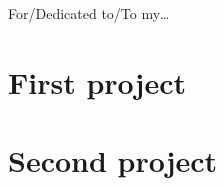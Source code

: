 \documentclass[10pt, twoside]{Thesis}
\begin{document}
\begin{glossary}
\end{glossary}



\begin{dedicatory}
	For/Dedicated to/To my\ldots
\end{dedicatory}



\addvspacetoc{3mm} %

\mainmatter %



\part{First project}


% 

\begin{appendices}
	
\end{appendices}


\part{Second project}


% 

\begin{appendices}
	
\end{appendices}
\end{document}
